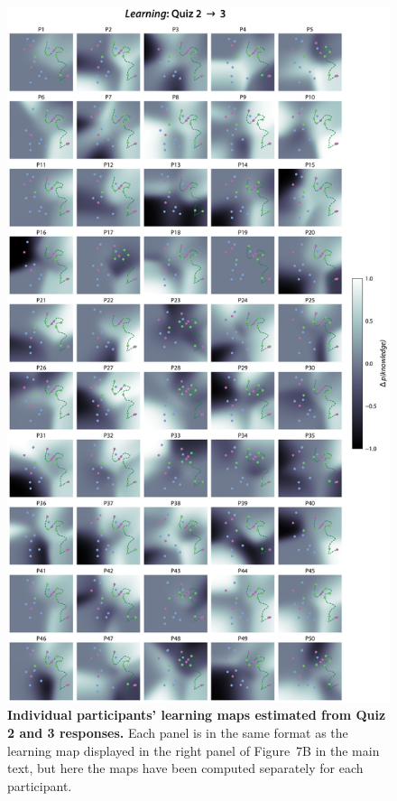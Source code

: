 \documentclass[10pt]{article}
\newcommand{\knowledgeMaps}{7}
\begin{document}
\begin{figure}[tp]
    \centering
    \includegraphics[height=0.9\textheight]{figs/individual-learnings-maps-quiz2-3}
    
    \caption{\textbf{Individual participants' learning maps estimated from
    Quiz 2 and 3 responses.} Each panel is in the same format as the learning map
    displayed in the right panel of Figure~\knowledgeMaps B in the main text,
    but here the maps have been computed separately for each participant.}
    
    \label{fig:learning-maps-q2_3}
\end{figure}


% 
% 
\end{document}
